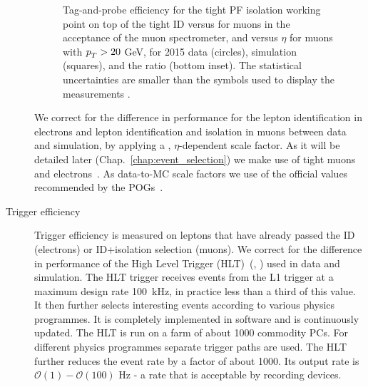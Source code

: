 \begin{description}
\begin{figure}[htp]
\centering
  \def\twidth{0.45}
  \centering
  \hfil
\caption{Tag-and-probe efficiency for the tight PF isolation working point on top of the tight ID versus \pt for muons in the acceptance of the muon spectrometer, and versus $\eta$ for muons with $p_{T}^{}> 20$ GeV, for 2015 data (circles), simulation (squares), and the ratio (bottom inset). The statistical uncertainties are smaller than the symbols used to display the measurements \cite{Sirunyan:2018fpa}.}
\label{fig:CMS-MUO-16-001_Figure_008}
\end{figure}

We correct for the difference in performance for the lepton identification in electrons and lepton identification and isolation in muons between data and simulation, by applying a \pt, $\eta$-dependent scale factor. As it will be detailed later (Chap.~\ref{chap:event_selection}) we make use of tight muons~\cite{twiki:MUO} and electrons~\cite{twiki:EGM}. As data-to-MC scale factors we use of the official values recommended by the POGs~\cite{twiki:MuonSF,twiki:EGMSF}.


\item[Trigger efficiency]

Trigger efficiency is measured on leptons that have already passed the ID (electrons) or ID+isolation selection (muons). We correct for the difference in performance of the High Level Trigger (HLT)~(\cite{Adam:2005zf}, \cite{Sphicas:2002gg}) used in data and simulation. The HLT trigger receives events from the L1 trigger at a maximum design rate 100~kHz, in practice less than a third of this value. It then further selects interesting events according to various physics programmes. It is completely implemented in software and is continuously updated. The HLT is run on a farm of about 1000 commodity PCs. For different physics programmes separate trigger paths are used. The HLT further reduces the event rate by a factor of about 1000. Its output rate is $\mathcal{O}(1)-\mathcal{O}(100)$ Hz - a rate that is acceptable by recording devices.


\end{description}
